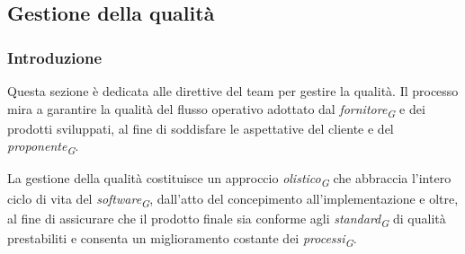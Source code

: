 \subsection{Gestione della qualità}
\subsubsection{Introduzione}
Questa sezione è dedicata alle direttive del team per gestire la qualità. Il processo mira a garantire la qualità del flusso operativo adottato dal \textit{fornitore}\textsubscript{\textit{G}} e dei prodotti sviluppati, al fine di soddisfare le aspettative del cliente e del \textit{proponente}\textsubscript{\textit{G}}.

La gestione della qualità costituisce un approccio \textit{olistico}\textsubscript{\textit{G}} che abbraccia l'intero ciclo di vita del \textit{software}\textsubscript{\textit{G}}, dall'atto del concepimento all'implementazione e oltre, al fine di assicurare che il prodotto finale sia conforme agli \textit{standard}\textsubscript{\textit{G}} di qualità prestabiliti e consenta un miglioramento costante dei \textit{processi}\textsubscript{\textit{G}}.


